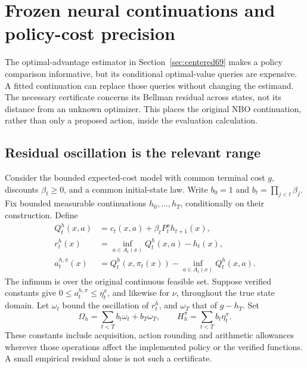 \section{Frozen neural continuations and policy-cost precision}\label{sec:frozen72}
The optimal-advantage estimator in Section~\ref{sec:centered69} makes a policy comparison informative, but its conditional optimal-value queries are expensive. A fitted continuation can replace those queries without changing the estimand. The necessary certificate concerns its Bellman residual across states, not its distance from an unknown optimizer. This places the original NBO continuation, rather than only a proposed action, inside the evaluation calculation.

\subsection{Residual oscillation is the relevant range}
Consider the bounded expected-cost model with common terminal cost $g$, discounts $\beta_t\ge0$, and a common initial-state law. Write $b_0=1$ and $b_t=\prod_{j<t}\beta_j$. Fix bounded measurable continuations $h_0,\ldots,h_T$, conditionally on their construction. Define
\begin{align*}
 Q_t^h(x,a)&=c_t(x,a)+\beta_tP_t^a h_{t+1}(x),\\
 r_t^h(x)&=\inf_{a\in A_t(x)}Q_t^h(x,a)-h_t(x),\\
 a_t^{h,\pi}(x)&=Q_t^h(x,\pi_t(x))-\inf_{a\in A_t(x)}Q_t^h(x,a).
\end{align*}
The infimum is over the original continuous feasible set. Suppose verified constants give $0\le a_t^{h,\pi}\le\eta_t^\pi$, and likewise for $\nu$, throughout the true state domain. Let $\omega_t$ bound the oscillation of $r_t^h$, and $\omega_T$ that of $g-h_T$. Set
\[
 \Omega_h=\sum_{t<T}b_t\omega_t+b_T\omega_T,
 \qquad H_h^\pi=\sum_{t<T}b_t\eta_t^\pi.
\]
These constants include acquisition, action rounding and arithmetic allowances wherever those operations affect the implemented policy or the verified functions. A small empirical residual alone is not such a certificate.

